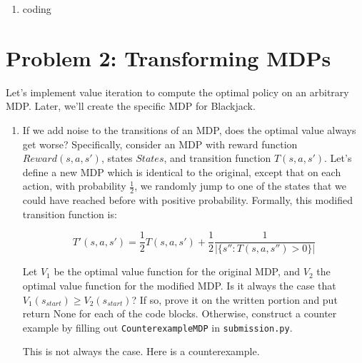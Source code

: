 \documentclass[10pt]{article}
\begin{document}
\begin{enumerate}[label=(\alph*)]
  \item coding

\end{enumerate}
\iffalse
\section*{\normalsize Problem 2: Transforming MDPs}

Let's implement value iteration to compute the optimal policy on an arbitrary MDP. Later, we'll create the specific MDP for Blackjack. 
\smallskip

\begin{enumerate}[label=(\alph*)]

  \item If we add noise to the transitions of an MDP, does the optimal value always get worse? Specifically, consider an MDP with reward function $Reward(s,a,s')$, states $States$, and transition function $T(s,a,s′)$. Let's define a new MDP which is identical to the original, except that on each action, with probability $\frac{1}{2}$, we randomly jump to one of the states that we could have reached before with positive probability. Formally, this modified transition function is:
  
  $$T'(s,a,s') = \frac{1}{2} T(s,a,s') + \frac{1}{2} \frac{1}{| \{ s'':T(s,a,s'')>0 \} |}$$
  
  Let $V_1$ be the optimal value function for the original MDP, and $V_2$ the optimal value function for the modified MDP. Is it always the case that $V_1(s_{start}) \geq V_2(s_{start})$? If so, prove it on the written portion and put return None for each of the code blocks. Otherwise, construct a counter example by filling out \texttt{CounterexampleMDP} in \texttt{submission.py}.
  
  This is not always the case. Here is a counterexample.
  
  \begin{center}
\end{center}
\end{enumerate}
\end{document}
